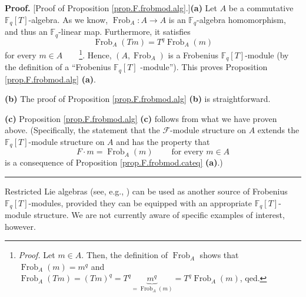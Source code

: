 \documentclass[numbers=enddot,12pt,final,onecolumn,notitlepage]{scrartcl}%
\theoremstyle{definition}
\newenvironment{proof}[1][Proof]{\noindent\textbf{#1.} }{\ \rule{0.5em}{0.5em}}
\begin{document}
\begin{proof}
[Proof of Proposition \ref{prop.F.frobmod.alg}.]\textbf{(a)} Let $A$ be a
commutative $\mathbb{F}_{q}\left[  T\right]  $-algebra. As we know,
$\operatorname*{Frob}\nolimits_{A}:A\rightarrow A$ is an $\mathbb{F}_{q}%
$-algebra homomorphism, and thus an $\mathbb{F}_{q}$-linear map. Furthermore,
it satisfies%
\[
\operatorname*{Frob}\nolimits_{A}\left(  Tm\right)  =T^{q}\operatorname*{Frob}%
\nolimits_{A}\left(  m\right)
\]
for every $m\in A$\ \ \ \ \footnote{\textit{Proof.} Let $m\in A$. Then, the
definition of $\operatorname*{Frob}\nolimits_{A}$ shows that
$\operatorname*{Frob}\nolimits_{A}\left(  m\right)  =m^{q}$ and
$\operatorname*{Frob}\nolimits_{A}\left(  Tm\right)  =\left(  Tm\right)
^{q}=T^{q}\underbrace{m^{q}}_{=\operatorname*{Frob}\nolimits_{A}\left(
m\right)  }=T^{q}\operatorname*{Frob}\nolimits_{A}\left(  m\right)  $, qed.}.
Hence, $\left(  A,\operatorname*{Frob}\nolimits_{A}\right)  $ is a Frobenius
$\mathbb{F}_{q}\left[  T\right]  $-module (by the definition of a
\textquotedblleft Frobenius $\mathbb{F}_{q}\left[  T\right]  $%
-module\textquotedblright). This proves Proposition \ref{prop.F.frobmod.alg}
\textbf{(a)}. \medskip

\textbf{(b)} The proof of Proposition \ref{prop.F.frobmod.alg} \textbf{(b)} is
straightforward. \medskip

\textbf{(c)} Proposition \ref{prop.F.frobmod.alg} \textbf{(c)} follows from
what we have proven above. (Specifically, the statement that the $\mathcal{F}%
$-module structure on $A$ extends the $\mathbb{F}_{q}\left[  T\right]
$-module structure on $A$ and has the property that
\[
F\cdot m=\operatorname*{Frob}\nolimits_{A}\left(  m\right)
\ \ \ \ \ \ \ \ \ \ \text{for every }m\in A
\]
is a consequence of Proposition \ref{prop.F.frobmod.cateq} \textbf{(a)}.)
\end{proof}

Restricted Lie algebras (see, e.g., \cite{jacobson-rl}) can be used as another
source of Frobenius $\mathbb{F}_{q}\left[  T\right]  $-modules, provided they
can be equipped with an appropriate $\mathbb{F}_{q}\left[  T\right]  $-module
structure. We are not currently aware of specific examples of interest, however.
\end{document}

